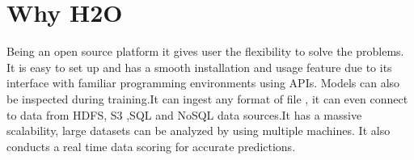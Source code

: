 \documentclass[9pt,twocolumn,twoside]{styles/osajnl}
\begin{document}
\section{Why H2O}
\cite{www-h2o-why}Being an open source platform it gives
user the flexibility to solve the problems. It is easy to set up and
has a smooth installation and usage feature due to its interface with
familiar programming environments using APIs. Models can also be
inspected during training.It can ingest any format of file , it can
even connect to data from HDFS, S3 ,SQL and NoSQL data sources.It has
a massive scalability, large datasets can be analyzed by using
multiple machines. It also conducts a real time data scoring for
accurate predictions.


\end{document}
